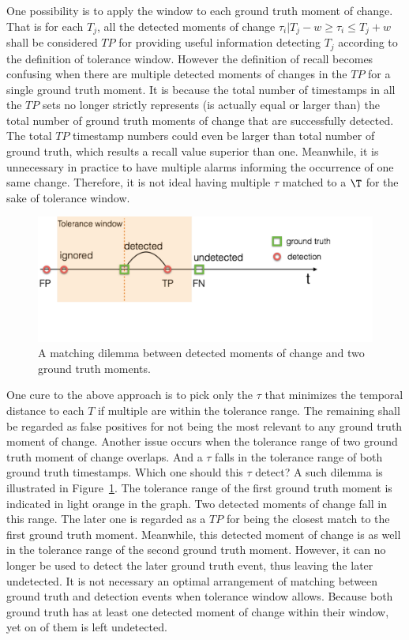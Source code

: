One possibility is to apply the window to each ground truth moment of change.
That is for each $T_j$, all the detected moments of change ${\tau_i | T_j - w \geq \tau_i \leq T_j + w }$ shall be considered $TP$ for providing useful information detecting $T_j$ according to the definition of tolerance window.
However the definition of recall becomes confusing when there are multiple detected moments of changes in the $TP$ for a single ground truth moment.
It is because the total number of timestamps in all the $TP$ sets no longer strictly represents (is actually equal or larger than) the total number of ground truth moments of change that are successfully detected.
The total $TP$ timestamp numbers could even be larger than total number of ground truth, which results a recall value superior than one.
Meanwhile, it is unnecessary in practice to have multiple alarms informing the occurrence of one same change.
Therefore, it is not ideal having multiple $\tau$ matched to a $\T$ for the sake of tolerance window.

\begin{figure}[!htb]
\centering
\includegraphics[width=.95\textwidth]{gfx/chap4/matching_dilemma.pdf}
\caption{A matching dilemma between detected moments of change and two ground truth moments.}
\label{fig:matching_dilemma}
\end{figure}

One cure to the above approach is to pick only the $\tau$ that minimizes the temporal distance to each $T$ if multiple are within the tolerance range.
The remaining shall be regarded as false positives for not being the most relevant to any ground truth moment of change.
Another issue occurs when the tolerance range of two ground truth moment of change overlaps.
And a $\tau$ falls in the tolerance range of both ground truth timestamps.
Which one should this $\tau$ detect?
A such dilemma is illustrated in Figure~\ref{fig:matching_dilemma}.
The tolerance range of the first ground truth moment is indicated in light orange in the graph.
Two detected moments of change fall in this range.
The later one is regarded as a $TP$ for being the closest match to the first ground truth moment.
Meanwhile, this detected moment of change is as well in the tolerance range of the second ground truth moment.
However, it can no longer be used to detect the later ground truth event, thus leaving the later undetected.
It is not necessary an optimal arrangement of matching between ground truth and detection events when tolerance window allows.
Because both ground truth has at least one detected moment of change within their window, yet on of them is left undetected.

